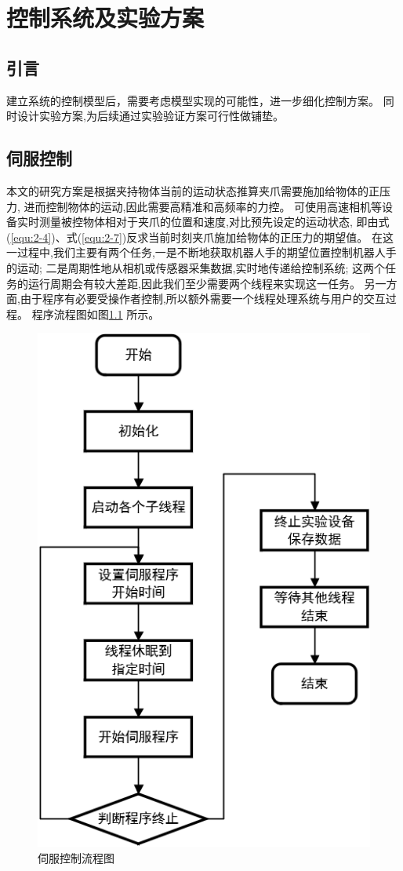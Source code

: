 \chapter{控制系统及实验方案}

\section{引言}
建立系统的控制模型后，需要考虑模型实现的可能性，进一步细化控制方案。
同时设计实验方案,为后续通过实验验证方案可行性做铺垫。

\section{伺服控制}
本文的研究方案是根据夹持物体当前的运动状态推算夹爪需要施加给物体的正压力,
进而控制物体的运动,因此需要高精准和高频率的力控。
可使用高速相机等设备实时测量被控物体相对于夹爪的位置和速度,对比预先设定的运动状态,
即由式(\ref{equ:2-4})、式(\ref{equ:2-7})反求当前时刻夹爪施加给物体的正压力的期望值。
在这一过程中,我们主要有两个任务,一是不断地获取机器人手的期望位置控制机器人手的运动;
二是周期性地从相机或传感器采集数据,实时地传递给控制系统;
这两个任务的运行周期会有较大差距,因此我们至少需要两个线程来实现这一任务。
另一方面,由于程序有必要受操作者控制,所以额外需要一个线程处理系统与用户的交互过程。
程序流程图如图\ref{fig:3-1} 所示。

\begin{figure}[!ht]
  \centering
  \includegraphics[scale=0.48]{chapter03/pic/3-1}
  \caption{伺服控制流程图\label{fig:3-1}}
  \vspace{-0.3cm}
\end{figure}

